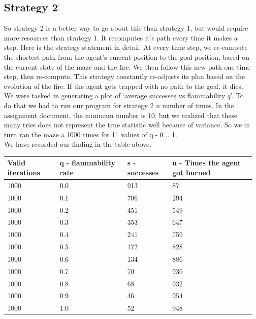 \documentclass[11pt]{scrartcl} %
\begin{document}
\subsection{Strategy 2}
So strategy 2 is a better way to go about this than strategy 1, but would require more resources than strategy 1. It recomputes it's path every time it makes a step. Here is the strategy statement in detail. At every time step, we re-compute the shortest path from the agent’s current position to the goal position, based on  the  current  state  of  the  maze  and  the  fire.  We then follow  this  new  path  one  time  step,  then  re-compute.   This strategy constantly re-adjusts its plan based on the evolution of the fire.  If the agent gets trapped with no path to the goal, it dies.
\vspace{2em}\\
We were tasked in generating a plot of ‘average successes vs flammability $q$’. To do that we had to run our program for strategy 2 $n$ number of times. In the assignment document, the minimum number is 10, but we realized that these many tries does not represent the true statistic well because of variance. So we in turn ran the maze a 1000 times for 11 values of q - 0 .. 1.\vspace{2em}\\
We have recorded our finding in the table above.\\
\begin{table}[!htb]
\begin{tabular}{|l|l|l|l|}
\hline
\textbf{Valid iterations} & \textbf{q - flammability rate} & \textbf{s - successes} & \textbf{u - Times the agent got burned} \\ \hline
1000 & 0.0   & 913 & 87  \\ \hline
1000 & 0.1 & 706 & 294 \\ \hline
1000 & 0.2 & 451 & 549 \\ \hline
1000 & 0.3 & 353 & 647 \\ \hline
1000 & 0.4 & 241 & 759 \\ \hline
1000 & 0.5 & 172 & 828 \\ \hline
1000 & 0.6 & 134 & 886 \\ \hline
1000 & 0.7 & 70  & 930 \\ \hline
1000 & 0.8 & 68  & 932 \\ \hline
1000 & 0.9 & 46  & 954 \\ \hline
1000 & 1.0 & 52  & 948 \\ \hline
\end{tabular}
\end{table}\\
\end{document}
